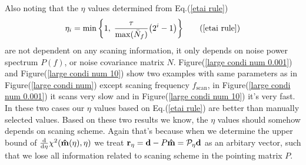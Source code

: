 \documentclass[11pt, letterpaper]{article}
\newcommand{\vbd}{\vb{d}}
\newcommand{\hatm}{\vb{\hat{m}}}
\newcommand{\Nbar}{\bar{N}}
\begin{document}
Also noting that the $\eta$ values determined from Eq.(\ref{etai rule})
\begin{align}
\eta_i =\min \qty\bigg{1,\; \frac{\tau}{\max(\Nbar_f)} \qty(2^i -1) } 
\tag{\ref{etai rule}}
\end{align}
are not dependent on any scaning information,
it only depends on noise power spectrum $P(f)$, or noise covariance matrix $N$.
Figure(\ref{large condi num 0.001}) and Figure(\ref{large condi num 10}) show
two examples with same parameters as in Figure(\ref{large condi num}) except 
scaning frequency $f_{\text{scan}}$, in Figure(\ref{large condi num 0.001}) it
scans very slow and in Figure(\ref{large condi num 10}) it's very fast.
In these two cases our $\eta$ values based on Eq.(\ref{etai rule}) are better
than manually selected values.
Based on these two results we know, the $\eta$ values should somehow depends
on scaning scheme.
Again that's because when we determine the upper bound of 
$\dv{\eta} \chi^2(\hatm(\eta), \eta)$ we treat
$\vb{r}_{\eta} = \vbd - P\hatm = \mathcal{P}_{\eta} \vbd$
as an arbitary vector, such that we lose all information related to scaning 
scheme in the pointing matrix $P$.
\end{document}
